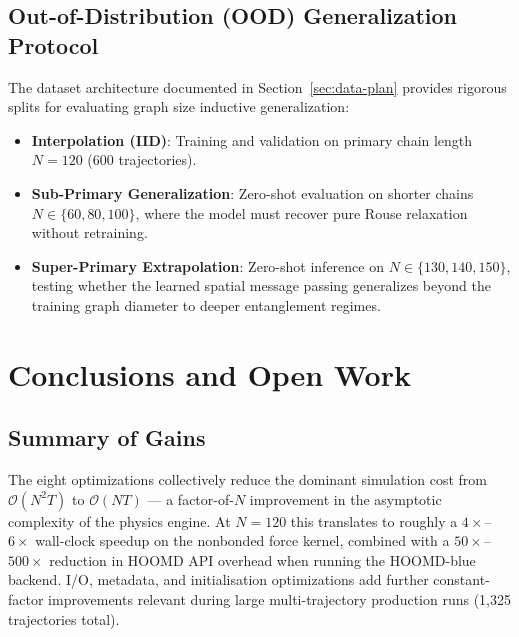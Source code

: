 \documentclass[12pt,a4paper]{article}
\newcommand{\Obig}[1]{\mathcal{O}\!\left(#1\right)}
\begin{document}
\subsection{Out-of-Distribution (OOD) Generalization Protocol}
\label{sec:ood}

The dataset architecture documented in Section~\ref{sec:data-plan} provides rigorous splits for evaluating graph size inductive generalization:
\begin{itemize}
  \item \textbf{Interpolation (IID)}: Training and validation on primary chain length $N = 120$ (600 trajectories).
  \item \textbf{Sub-Primary Generalization}: Zero-shot evaluation on shorter chains $N \in \{60, 80, 100\}$, where the model must recover pure Rouse relaxation without retraining.
  \item \textbf{Super-Primary Extrapolation}: Zero-shot inference on $N \in \{130, 140, 150\}$, testing whether the learned spatial message passing generalizes beyond the training graph diameter to deeper entanglement regimes.
\end{itemize}


\section{Conclusions and Open Work}
\label{sec:conc}

\subsection{Summary of Gains}

The eight optimizations collectively reduce the dominant simulation cost from
$\Obig{N^2 T}$ to $\Obig{NT}$ — a factor-of-$N$ improvement in the asymptotic
complexity of the physics engine. At $N=120$ this translates to roughly a
$4\times$--$6\times$ wall-clock speedup on the nonbonded force kernel, combined
with a $50\times$--$500\times$ reduction in HOOMD API overhead when running
the HOOMD-blue backend. I/O, metadata, and initialisation optimizations add
further constant-factor improvements relevant during large multi-trajectory
production runs (1,325 trajectories total).
\end{document}
